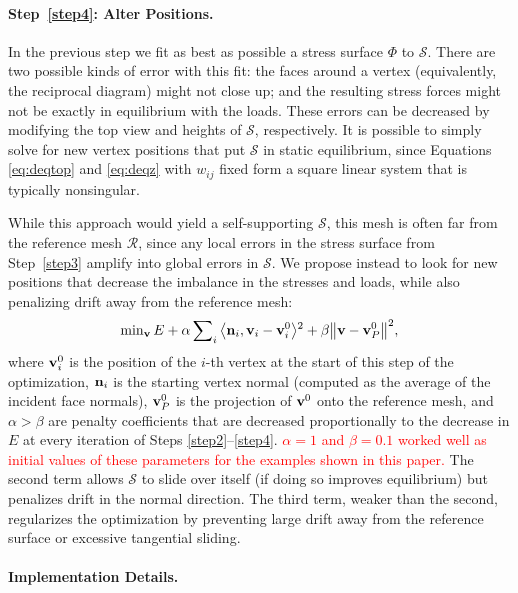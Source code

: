 \documentclass[annual]{acmsiggraph}
\def\<{\mathchoice{\big\langle}{\langle}{\langle}{\langle}}
\def\>{\mathchoice{\big\rangle}{\rangle}{\rangle}{\rangle}}
\def\SS{{\mathcal S}}
\def\RR{{\mathcal R}}
\newcommand{\newtext}[1]{\textcolor{red}{#1}}
\begin{document}


\paragraph{Step~\ref{step4}: Alter Positions.} In the previous step we fit
as best as possible a stress surface $\Phi$ to $\SS$. There are two
possible kinds of error with this fit: the faces around a vertex
(equivalently, the reciprocal diagram) might not close up; and the
resulting stress forces might not be exactly in equilibrium with the
loads. These errors can be decreased by modifying the top view and heights
of $\SS$, respectively. It is possible to simply solve for new vertex
positions that put $\SS$ in static equilibrium, since Equations
\eqref{eq:deqtop} and \eqref{eq:deqz} with $w_{ij}$ fixed form a square
linear system that is typically nonsingular.

While this approach would yield a self-supporting $\SS$, this mesh is
often far from the reference mesh $\RR$, since any local errors in the
stress surface from Step~\ref{step3} amplify into global errors in $\SS$.
We propose instead to look for new positions that decrease the imbalance
in the stresses and loads, while also penalizing drift away from the
reference mesh:
	\begin{align*}
	\min\nolimits_{\vw} E
	+ \alpha \sum\nolimits_i
		\<\nw_i, \vw_i - \vw^0_i \>^2
		+ \beta \big\|\vw - \vw^0_P\big\|^2,
	\end{align*}
 where ${\mathbf v}^0_i$ is the position of the $i$-th vertex at the start of this
step of the optimization, ${\mathbf n}_i$ is the starting vertex normal (computed
as the average of the incident face normals), ${\mathbf v}^0_P$ is the projection
of ${\mathbf v}^0$ onto the reference mesh, and $\alpha > \beta$ are penalty
coefficients that are decreased proportionally to the decrease in $E$ at every iteration of Steps
\ref{step2}--\ref{step4}. \newtext{$\alpha=1$ and $\beta=0.1$ worked well as initial values of these parameters for the examples shown in this paper.} The second term allows $\SS$ to
slide over itself (if doing so improves equilibrium) but penalizes drift
in the normal direction. The third term, weaker than the second,
regularizes the optimization by preventing large drift away from the
reference surface or excessive tangential sliding.

\paragraph{Implementation Details.}
\end{document}
